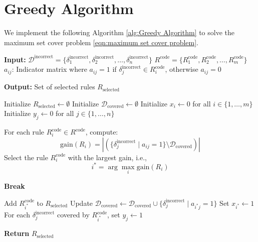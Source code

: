 \documentclass{article} %
\begin{document}
\section{Greedy Algorithm}
\label{sec:Greedy Algorithm}

We implement the following Algorithm \ref{alg:Greedy Algorithm} to solve the maximum set cover problem \ref{eqn:maximum set cover problem}. 


\begin{algorithm}[H]
\caption{Greedy Algorithm for Maximum Set Cover Problem}
\label{alg:Greedy Algorithm}
\begin{algorithmic}[1]
\State \textbf{Input:} 
\State $\mathcal{D}^{\text{incorrect}} = \{ \delta^{\text{incorrect}}_1, \delta^{\text{incorrect}}_2, \ldots, \delta^{\text{incorrect}}_n \}$ 
\State $R^{\text{code}} = \{ R^{\text{code}}_1, R^{\text{code}}_2, \ldots, R^{\text{code}}_m \}$ 
\State $a_{ij}$: Indicator matrix where $a_{ij} = 1$ if $\delta^{\text{incorrect}}_j \in R^{\text{code}}_i$, otherwise $a_{ij} = 0$

\State \textbf{Output:} Set of selected rules $R_{\text{selected}}$

\State Initialize $R_{\text{selected}} \gets \emptyset$
\State Initialize $\mathcal{D}_{\text{covered}} \gets \emptyset$ 
\State Initialize $x_i \gets 0$ for all $i \in \{1, \ldots, m\}$ 
\State Initialize $y_j \gets 0$ for all $j \in \{1, \ldots, n\}$ 

    \State For each rule $R_i^{\text{code}} \in R^{\text{code}}$, compute:
    \[
    \text{gain}(R_i) = \left| \left( \{ \delta^{\text{incorrect}}_j \mid a_{ij} = 1 \} \setminus \mathcal{D}_{\text{covered}} \right) \right|
    \]
    \State Select the rule $R_i^{\text{code}}$ with the largest gain, i.e.,
    \[
    i^* = \arg\max_i \text{gain}(R_i)
    \]
    
        \State \textbf{Break} 
    \EndIf

    \State Add $R_{i^*}^{\text{code}}$ to $R_{\text{selected}}$
    \State Update $\mathcal{D}_{\text{covered}} \gets \mathcal{D}_{\text{covered}} \cup \{ \delta^{\text{incorrect}}_j \mid a_{i^*j} = 1 \}$
    \State Set $x_{i^*} \gets 1$ 
    \State For each $\delta^{\text{incorrect}}_j$ covered by $R_{i^*}^{\text{code}}$, set $y_j \gets 1$
\EndWhile

\State \textbf{Return} $R_{\text{selected}}$
\end{algorithmic}
\end{algorithm}
\end{document}
